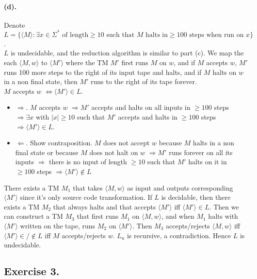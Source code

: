 \documentclass[12pt]{article}
\begin{document}
\paragraph*{(d).} Denote \(L = \{\langle M \rangle : \exists x \in \Sigma^* \text{ of length} \geq 10 \text{ such that } M \text{ halts in} \geq 100 \text{ steps when run on } x\}\).\\
\(L\) is undecidable, and the reduction algorithm is similar to part (c). We map the each \(\langle M, w\rangle\) to \(\langle M' \rangle\) where the TM \(M'\) first runs \(M\) on \(w\), and if \(M\) accepts \(w\), \(M'\) runs 100 more steps to the right of its input tape and halts, and if \(M\) halts on \(w\) in a non final state, then \(M'\) runs to the right of its tape forever.\\
\(M\) accepts \(w\) \(\Leftrightarrow \langle M'\rangle \in L\).
\begin{itemize}
  \item \(\Rightarrow\). \(M\) accepts \(w\) \(\Rightarrow M'\) accepts and halts on all inputs in \(\geq 100\) steps \(\Rightarrow \exists x\) with \(|x| \geq 10\) such that \(M'\) accepts and halts in \(\geq 100\) steps \(\Rightarrow \langle M' \rangle \in L\).
  \item \(\Leftarrow\). Show contraposition. \(M\) does not accept \(w\) because \(M\) halts in a non final state or because \(M\) does not halt on \(w\) \(\Rightarrow M'\) runs forever on all its inputs  \(\Rightarrow\) there is no input of length \(\geq 10\) such that \(M'\) halts on it in \(\geq 100\) steps \(\Rightarrow \langle M' \rangle \notin L\)
\end{itemize}
There exists a TM \(M_1\) that takes \(\langle M, w\rangle\) as input and outputs corresponding \(\langle M' \rangle\) since it's only source code transformation. If \(L\) is decidable, then there exists a TM \(M_2\) that always halts and that accepts \(\langle M'\rangle\) iff \(\langle M'\rangle \in L\). Then we can construct a TM \(M_3\) that first runs \(M_1\) on \(\langle M, w\rangle\), and when \(M_1\) halts with \(\langle M' \rangle\) written on the tape, runs \(M_2\) on \(\langle M' \rangle\). Then \(M_3\) accepts/rejects \(\langle M, w\rangle\) iff \(\langle M' \rangle \in/\notin L\) iff \(M\) accepts/rejects \(w\). \(L_u\) is recursive, a contradiction. Hence \(L\) is undecidable.

\subsection*{Exercise 3.}
\end{document}
